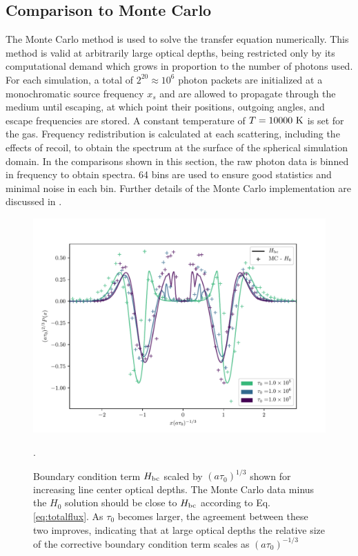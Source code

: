 \documentclass{aastex63}
\begin{document}
\subsection{Comparison to Monte Carlo}
The Monte Carlo method is used to solve the transfer equation numerically. This method is valid at arbitrarily large optical depths, being restricted only by its computational demand which grows in proportion to the number of photons used. For each simulation, a total of $2^{20} \approx 10^6$ photon packets are initialized at a monochromatic source frequency $x_s$ and are allowed to propagate through the medium until escaping, at which point their positions, outgoing angles, and escape frequencies are stored. A constant temperature of $T=10000\ \rm K$ is set for the gas. Frequency redistribution is calculated at each scattering, including the effects of recoil, to obtain the spectrum at the surface of the spherical simulation domain. In the comparisons shown in this section, the raw photon data is binned in frequency to obtain spectra. 64 bins are used to ensure good statistics and minimal noise in each bin. Further details of the Monte Carlo implementation are discussed in \cite{2017ApJ...851..150H}.

\ifx
\begin{figure}
    \centering
    \includegraphics{taubc.pdf}
    \caption{Boundary condition term $H_{\rm bc}$ scaled by $(a\tau_0)^{1/3}$ shown for increasing line center optical depths. The Monte Carlo data minus the $H_0$ solution should be close to $H_{\rm bc}$ according to Eq. \ref{eq:totalflux}. As $\tau_0$ becomes larger, the agreement between these two improves, indicating that at large optical depths the relative size of the corrective boundary condition term scales as $(a\tau_0)^{-1/3}$}.
    \label{fig:taubc}
\end{figure}
\fi
\end{document}
